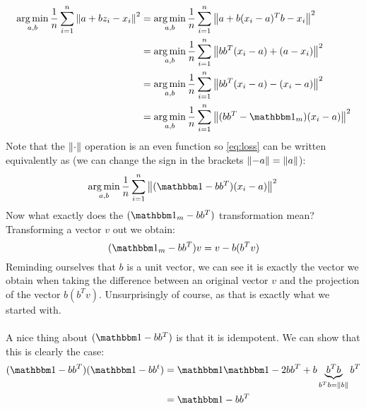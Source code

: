 \begin{equation}
\label{eq:loss}
\begin{split}
\argmin_{a, b}\frac{1}{n}\sum_{i=1}^{n}\norm{a + bz_i - x_i}^2 &=
\argmin_{a, b}\frac{1}{n}\sum_{i=1}^{n}\norm{a + b(x_i - a)^Tb - x_i}^2
\\
&= \argmin_{a, b}\frac{1}{n}\sum_{i=1}^{n}
		\norm{bb^T(x_i - a) + (a - x_i)}^2 \\
&= \argmin_{a, b}\frac{1}{n}\sum_{i=1}^{n}
		\norm{bb^T(x_i - a) - (x_i - a)}^2 \\
&= \argmin_{a, b}\frac{1}{n}\sum_{i=1}^{n}
		\norm{(bb^T - \ID_{m})(x_i - a)}^2 \\
\end{split}
\end{equation}
Note that the $\left\lVert\cdot\right\rVert$ operation is an even 
function so \ref{eq:loss} can be written equivalently
as (we can change the sign in the brackets 
$\left\lVert-a\right\rVert = \left\lVert a\right\rVert$):
\begin{equation}
\argmin_{a, b}\frac{1}{n}\sum_{i=1}^{n}\norm{(\ID - bb^T)(x_i - a)}^2 \\
\end{equation}
Now what exactly does the $(\ID_m - bb^T)$ transformation mean?
Transforming a vector $v$ out we obtain:
\begin{equation}
(\ID_m - bb^T)v = v - b(b^Tv)
\end{equation}
Reminding ourselves that $b$ is a unit vector, we can see it
is exactly the vector we obtain when taking the difference
between an original vector $v$ and the projection of the vector
$b(b^Tv)$. Unsurprisingly of course, as that is exactly what we 
started with.
\\\\
A nice thing about $(\ID - bb^T)$ is that it is idempotent.
We can show that this is clearly the case:
\begin{equation}
\label{eq:idempot}
\begin{split}
	(\ID -bb^T)(\ID - bb^t) &= \ID\ID - 2bb^T 
			+ b\underbrace{b^Tb}_{b^Tb = \norm{b}}b^T\\
&= \ID - bb^T\\
\end{split}
\end{equation}\\

